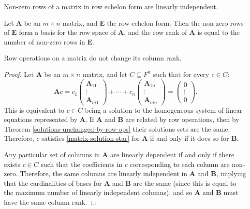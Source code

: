 \begin{lemma}
    Non-zero rows of a matrix in row echelon form are linearly independent.
\end{lemma}

\begin{cor}
    Let $\boldsymbol{A}$ be an $m \times n$ matrix, and $\boldsymbol{E}$ the row echelon form. Then the non-zero rows of $\boldsymbol{E}$ form a basis for the row space of $\boldsymbol{A}$, and the row rank of $\boldsymbol{A}$ is equal to the number of non-zero rows in $\boldsymbol{E}$.
\end{cor}

\begin{lemma}\label{row-ops-column-rank}
    Row operations on a matrix do not change its column rank.
\end{lemma}

\begin{proof}
    Let $\boldsymbol{A}$ be an $m \times n$ matrix, and let $C \subseteq F^n$ such that for every $c \in C$:
    \begin{equation}\label{matrix-solution-star}\tag{$\star$}
        \boldsymbol{A}c = c_1\begin{pmatrix} \boldsymbol{A}_{11} \\ \vdots \\ \boldsymbol{A}_{m1} \end{pmatrix} + \cdots + c_n\begin{pmatrix} \boldsymbol{A}_{1n} \\ \vdots \\ \boldsymbol{A}_{mn} \end{pmatrix} = \begin{pmatrix} 0 \\ \vdots \\ 0 \end{pmatrix}.
    \end{equation}
    This is equivalent to $c \in C$ being a solution to the homogeneous system of linear equations represented by $\boldsymbol{A}$. If $\boldsymbol{A}$ and $\boldsymbol{B}$ are related by row operations, then by Theorem \ref{solutions-unchanged-by-row-ops} their solutions sets are the same. Therefore, $c$ satisfies \ref{matrix-solution-star} for $\boldsymbol{A}$ if and only if it does so for $\boldsymbol{B}$.

    Any particular set of columns in $\boldsymbol{A}$ are linearly dependent if and only if there exists $c \in C$ such that the coefficients in $c$ corresponding to each column are non-zero. Therefore, the same columns are linearly independent in $\boldsymbol{A}$ and $\boldsymbol{B}$, implying that the cardinalities of bases for $\boldsymbol{A}$ and $\boldsymbol{B}$ are the same (since this is equal to the maximum number of linearly independent columns), and so $\boldsymbol{A}$ and $\boldsymbol{B}$ must have the same column rank.
\end{proof}

